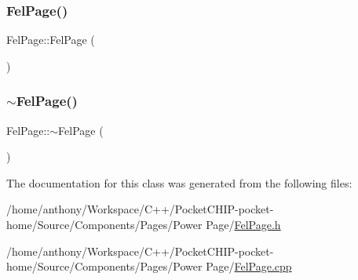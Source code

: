\subsubsection{\texorpdfstring{Fel\+Page()}{FelPage()}}
{\footnotesize\ttfamily Fel\+Page\+::\+Fel\+Page (\begin{DoxyParamCaption}{ }\end{DoxyParamCaption})}

\mbox{\label{classFelPage_abca2dc69df0593bf220248087fbfc493}} 
\subsubsection{\texorpdfstring{$\sim$\+Fel\+Page()}{~FelPage()}}
{\footnotesize\ttfamily Fel\+Page\+::$\sim$\+Fel\+Page (\begin{DoxyParamCaption}{ }\end{DoxyParamCaption})\hspace{0.3cm}{\ttfamily [inline]}}



The documentation for this class was generated from the following files\+:\begin{DoxyCompactItemize}
\item 
/home/anthony/\+Workspace/\+C++/\+Pocket\+C\+H\+I\+P-\/pocket-\/home/\+Source/\+Components/\+Pages/\+Power Page/\mbox{\hyperlink{FelPage_8h}{Fel\+Page.\+h}}\item 
/home/anthony/\+Workspace/\+C++/\+Pocket\+C\+H\+I\+P-\/pocket-\/home/\+Source/\+Components/\+Pages/\+Power Page/\mbox{\hyperlink{FelPage_8cpp}{Fel\+Page.\+cpp}}\end{DoxyCompactItemize}
